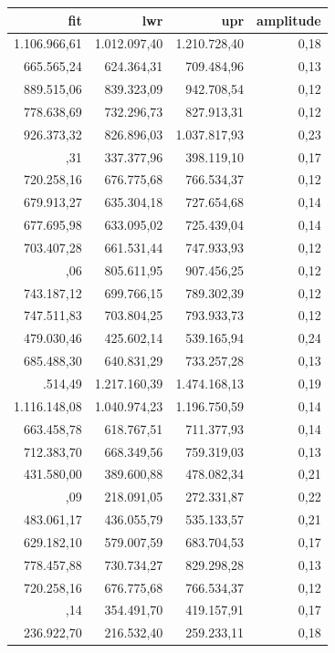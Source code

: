 \documentclass[a4paper]{article}
\begin{document}
\begin{table}

\centering
\begin{tabular}[t]{rrrr}
\toprule
fit & lwr & upr & amplitude\\
\midrule
1.106.966,61 & 1.012.097,40 & 1.210.728,40 & 0,18\\
665.565,24 & 624.364,31 & 709.484,96 & 0,13\\
889.515,06 & 839.323,09 & 942.708,54 & 0,12\\
778.638,69 & 732.296,73 & 827.913,31 & 0,12\\
926.373,32 & 826.896,03 & 1.037.817,93 & 0,23\\
\addlinespace
366.492,31 & 337.377,96 & 398.119,10 & 0,17\\
720.258,16 & 676.775,68 & 766.534,37 & 0,12\\
679.913,27 & 635.304,18 & 727.654,68 & 0,14\\
677.695,98 & 633.095,02 & 725.439,04 & 0,14\\
703.407,28 & 661.531,44 & 747.933,93 & 0,12\\
\addlinespace
855.019,06 & 805.611,95 & 907.456,25 & 0,12\\
743.187,12 & 699.766,15 & 789.302,39 & 0,12\\
747.511,83 & 703.804,25 & 793.933,73 & 0,12\\
479.030,46 & 425.602,14 & 539.165,94 & 0,24\\
685.488,30 & 640.831,29 & 733.257,28 & 0,13\\
\addlinespace
1.339.514,49 & 1.217.160,39 & 1.474.168,13 & 0,19\\
1.116.148,08 & 1.040.974,23 & 1.196.750,59 & 0,14\\
663.458,78 & 618.767,51 & 711.377,93 & 0,14\\
712.383,70 & 668.349,56 & 759.319,03 & 0,13\\
431.580,00 & 389.600,88 & 478.082,34 & 0,21\\
\addlinespace
243.707,09 & 218.091,05 & 272.331,87 & 0,22\\
483.061,17 & 436.055,79 & 535.133,57 & 0,21\\
629.182,10 & 579.007,59 & 683.704,53 & 0,17\\
778.457,88 & 730.734,27 & 829.298,28 & 0,13\\
720.258,16 & 676.775,68 & 766.534,37 & 0,12\\
\addlinespace
385.471,14 & 354.491,70 & 419.157,91 & 0,17\\
236.922,70 & 216.532,40 & 259.233,11 & 0,18\\

\end{tabular}
\end{table}
\end{document}
